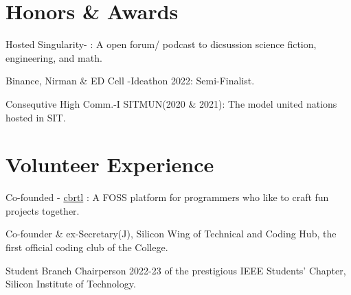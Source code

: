 \documentclass[]{assets/deedy-resume-openfont}
\begin{document}
\sectionsep
%
%
\section{Honors \& Awards}
\begin{tightemize}  
\item Hosted Singularity- : A open forum/ podcast to dicsussion science fiction, engineering, and math.\\
\item Binance, Nirman \& ED Cell -Ideathon 2022: Semi-Finalist.\\
\item Consequtive High Comm.-I SITMUN(2020 \& 2021): The model united nations hosted in SIT.
\end{tightemize}
\section{Volunteer Experience}
\begin{tightemize}  
\item Co-founded - \href{https://cbrtl.github.io}{cbrtl} : A FOSS platform for programmers who like to craft fun projects together.\\
\item Co-founder \& ex-Secretary(J), Silicon Wing of Technical and Coding Hub, the first official coding club of the College.\\
\item Student Branch Chairperson 2022-23 of the prestigious IEEE Students’ Chapter, Silicon Institute of Technology.\\
\end{tightemize}
\ 
\end{document}
